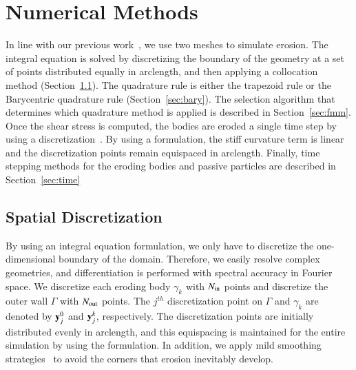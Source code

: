 \documentclass[preprint, 10pt]{elsarticle}
\begin{document}
\section{Numerical Methods}
\label{sec:method}
In line with our previous work~\cite{qua-moo2018}, we use two meshes to
simulate erosion. The integral equation is solved by discretizing the
boundary of the geometry at a set of points distributed equally in
arclength, and then applying a collocation method
(Section~\ref{sec:spatialDiscretization}).  The quadrature rule is
either the trapezoid rule or the Barycentric quadrature rule
(Section~\ref{sec:bary}).  The selection algorithm that determines which
quadrature method is applied is described in Section~\ref{sec:fmm}.
Once the shear stress is computed, the bodies are eroded a single time
step by using a {\thL} discretization~\cite{hou-low-she1994}.  By using
a {\thL} formulation, the stiff curvature term is linear and the
discretization points remain equispaced in arclength.  Finally, time
stepping methods for the eroding bodies and passive particles are
described in Section~\ref{sec:time}

\subsection{Spatial Discretization}
\label{sec:spatialDiscretization}
By using an integral equation formulation, we only have to discretize
the one-dimensional boundary of the domain.  Therefore, we easily
resolve complex geometries, and differentiation is performed with
spectral accuracy in Fourier space.  We discretize each eroding body
$\gamma_k$ with $N_{\mathrm{in}}$ points and discretize the outer wall $\Gamma$
with $N_{\mathrm{out}}$ points.  The $j^{th}$ discretization point on $\Gamma$ and
$\gamma_k$ are denoted by ${\mathbf{y}}_j^0$ and ${\mathbf{y}}^k_j$, respectively.  The
discretization points are initially distributed evenly in arclength, and
this equispacing is maintained for the entire simulation by using the
{\thL} formulation.  In addition, we apply mild smoothing
strategies~\cite{qua-moo2018} to avoid the corners that erosion
inevitably develop.
\end{document}
